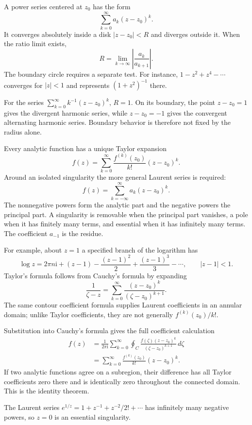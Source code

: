 A power series centered at $z_0$ has the form
\begin{equation}
\sum_{k=0}^{\infty}a_k(z-z_0)^k.
\end{equation}
It converges absolutely inside a disk $|z-z_0|<R$ and diverges outside it. When the ratio limit exists,
\begin{equation}
R=\lim_{k\to\infty}\left|\frac{a_k}{a_{k+1}}\right|.
\end{equation}
The boundary circle requires a separate test. For instance, $1-z^2+z^4-\cdots$ converges for $|z|<1$ and represents $(1+z^2)^{-1}$ there.

For the series $\sum_{k=0}^\infty k^{-1}(z-z_0)^k$, $R=1$. On its boundary, the point $z-z_0=1$ gives the divergent harmonic series, while $z-z_0=-1$ gives the convergent alternating harmonic series. Boundary behavior is therefore not fixed by the radius alone.

Every analytic function has a unique Taylor expansion
\begin{equation}
f(z)=\sum_{k=0}^{\infty}\frac{f^{(k)}(z_0)}{k!}(z-z_0)^k.
\end{equation}
Around an isolated singularity the more general Laurent series is required:
\begin{equation}
f(z)=\sum_{k=-\infty}^{\infty}a_k(z-z_0)^k.
\end{equation}
The nonnegative powers form the analytic part and the negative powers the principal part. A singularity is removable when the principal part vanishes, a pole when it has finitely many terms, and essential when it has infinitely many terms. The coefficient $a_{-1}$ is the residue.

For example, about $z=1$ a specified branch of the logarithm has
\begin{equation}
\log z=2\pi n\mathrm{i}+(z-1)-\frac{(z-1)^2}{2}+\frac{(z-1)^3}{3}-\cdots,
\qquad |z-1|<1.
\end{equation}
Taylor's formula follows from Cauchy's formula by expanding
\begin{equation}
\frac{1}{\zeta-z}=\sum_{k=0}^\infty\frac{(z-z_0)^k}{(\zeta-z_0)^{k+1}}.
\end{equation}
The same contour coefficient formula supplies Laurent coefficients in an annular domain; unlike Taylor coefficients, they are not generally $f^{(k)}(z_0)/k!$.

Substitution into Cauchy's formula gives the full coefficient calculation
\begin{align}
f(z)&=\frac{1}{2\pi\mathrm{i}}\sum_{k=0}^\infty\oint_C
\frac{f(\zeta)(z-z_0)^k}{(\zeta-z_0)^{k+1}}\,d\zeta\nonumber\\
&=\sum_{k=0}^\infty\frac{f^{(k)}(z_0)}{k!}(z-z_0)^k.
\end{align}
If two analytic functions agree on a subregion, their difference has all Taylor coefficients zero there and is identically zero throughout the connected domain. This is the identity theorem.

\begin{example}
The Laurent series $e^{1/z}=1+z^{-1}+z^{-2}/2!+\cdots$ has infinitely many negative powers, so $z=0$ is an essential singularity.
\end{example}